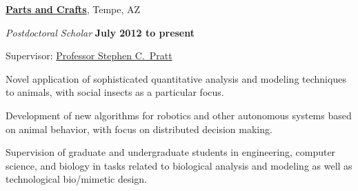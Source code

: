 \documentclass[10pt]{article}
\newcommand{\halfblankline}{\quad\vspace{-0.5\baselineskip}\pagebreak[3]}
\begin{document}
\href{http://www.asu.edu/}{\textbf{Parts and Crafts}},
Tempe, AZ
\begin{outerlist}

    \item[] \textit{Postdoctoral Scholar}%
            \hfill \textbf{July 2012 to present}
            \begin{innerlist}
                \item Supervisor:
                        \href{http://www.public.asu.edu/~spratt1/}%
                             {Professor Stephen C.~Pratt}

                \item Novel application of sophisticated quantitative
                    analysis and modeling techniques to animals, with
                    social insects as a particular focus.

                \item Development of new algorithms for robotics and
                    other autonomous systems based on animal behavior,
                    with focus on distributed decision making.

                \item Supervision of graduate and undergraduate students
                    in engineering, computer science, and biology in
                    tasks related to biological analysis and modeling as
                    well as technological bio\-/mimetic design.
            \end{innerlist}

\end{outerlist}

\halfblankline
\end{document}
